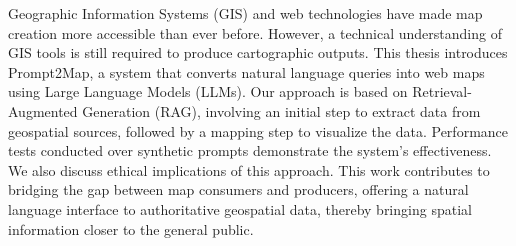 
%

Geographic Information Systems (GIS) and web technologies have made map creation more accessible than ever before. However, a technical understanding of GIS tools is still required to produce cartographic outputs. 
This thesis introduces Prompt2Map, a system that converts natural language queries into web maps using Large Language Models (LLMs). 
Our approach is based on Retrieval-Augmented Generation (RAG), involving an initial step to extract data from geospatial sources, followed by a mapping step to visualize the data. 
Performance tests conducted over synthetic prompts demonstrate the system's effectiveness. 
We also discuss ethical implications of this approach. 
This work contributes to bridging the gap between map consumers and producers, offering a natural language interface to authoritative geospatial data, thereby bringing spatial information closer to the general public.

